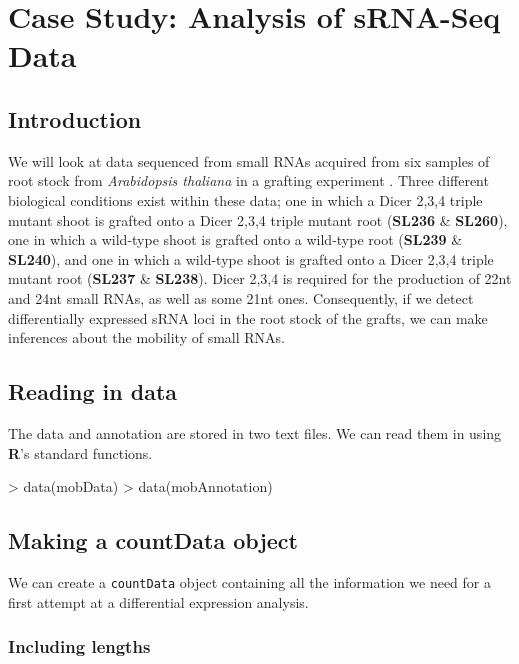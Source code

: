 \documentclass[a4paper]{article}
\begin{document}
\section{Case Study: Analysis of sRNA-Seq Data}

\subsection{Introduction}

We will look at data sequenced from small RNAs acquired from six samples of root stock from \textsl{Arabidopsis thaliana} in a grafting experiment \cite{molnar}. Three different biological conditions exist within these data; one in which a Dicer 2,3,4 triple mutant shoot is grafted onto a Dicer 2,3,4 triple mutant root (\textbf{SL236} \& \textbf{SL260}), one in which a wild-type shoot is grafted onto a wild-type root (\textbf{SL239} \& \textbf{SL240}), and one in which a wild-type shoot is grafted onto a Dicer 2,3,4 triple mutant root (\textbf{SL237} \& \textbf{SL238}). Dicer 2,3,4 is required for the production of 22nt and 24nt small RNAs, as well as some 21nt ones. Consequently, if we detect differentially expressed  sRNA loci in the root stock of the grafts, we can make inferences about the mobility of small RNAs.

\subsection{Reading in data}

The data and annotation are stored in two text files. We can read them in using \textbf{R}'s standard functions.
\begin{Schunk}
\begin{Sinput}
> data(mobData)
> data(mobAnnotation)
\end{Sinput}
\end{Schunk}

\subsection{Making a countData object}

We can create a \verb'countData' object containing all the information we need for a first attempt at a differential expression analysis.

\subsubsection{Including lengths}
\end{document}
